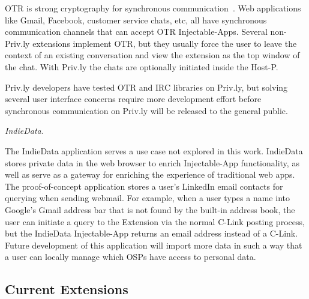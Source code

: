 \documentclass[letterpaper,twocolumn,10pt]{article}
\begin{document}
OTR is strong cryptography for synchronous communication~\cite{Goldberg}. Web applications like Gmail, Facebook, customer service chats, etc, all have synchronous communication channels that can accept OTR Injectable-Apps. Several non-Priv.ly extensions implement OTR, but they usually force the user to leave the context of an existing conversation and view the extension as the top window of the chat. With Priv.ly the chats are optionally initiated inside
the Host-P.

Priv.ly developers have tested OTR and IRC libraries on Priv.ly, but solving several user interface concerns require more development effort before synchronous communication on Priv.ly will be released to the general public.

\emph{IndieData.}

The IndieData application serves a use case not explored in this work. IndieData
stores private data in the web browser to enrich Injectable-App functionality, as well as serve as a gateway for enriching the experience of traditional web apps.
The proof-of-concept application stores a user's LinkedIn email contacts for querying when sending webmail. For example, when a user types a name into Google's Gmail address bar that is not found by the built-in address book, the user can initiate a query to the Extension via the normal C-Link posting process, but the IndieData Injectable-App
returns an email address instead of a C-Link. Future development of this application will import more data in such a way that a user can locally manage
which OSPs have access to personal data.

\subsection{Current Extensions} \label{sec:privly_implementation_extension}

\def\yes{$\color{green!50!black} \checkmark$}
\def\no{\color{red} X}
\end{document}
